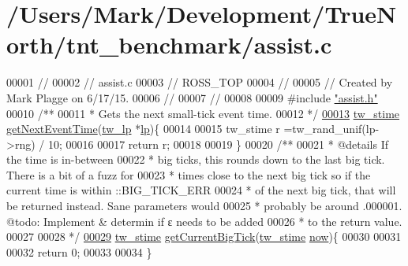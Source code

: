 \hypertarget{assist_8c_source}{}\section{/\+Users/\+Mark/\+Development/\+True\+North/tnt\+\_\+benchmark/assist.c}

\begin{DoxyCode}
00001 \textcolor{comment}{//}
00002 \textcolor{comment}{//  assist.c}
00003 \textcolor{comment}{//  ROSS\_TOP}
00004 \textcolor{comment}{//}
00005 \textcolor{comment}{//  Created by Mark Plagge on 6/17/15.}
00006 \textcolor{comment}{//}
00007 \textcolor{comment}{//}
00008 
00009 \textcolor{preprocessor}{#}\textcolor{preprocessor}{include} \hyperlink{assist_8h}{"assist.h"}
00010 \textcolor{comment}{/**}
00011 \textcolor{comment}{ *  Gets the next small-tick event time.}
00012 \textcolor{comment}{ */}
\hypertarget{assist_8c_source_l00013}{}\hyperlink{assist_8h_a30602b11dbfa6bcb90dc00e7942cfb02}{00013} \hyperlink{assist_8h_a30602b11dbfa6bcb90dc00e7942cfb02}{tw\_stime} \hyperlink{assist_8h_a30602b11dbfa6bcb90dc00e7942cfb02}{getNextEventTime}(\hyperlink{assist_8h_a30602b11dbfa6bcb90dc00e7942cfb02}{tw\_lp} *\hyperlink{assist_8h_a30602b11dbfa6bcb90dc00e7942cfb02}{lp})\{
00014 
00015     tw\_stime r =tw\_rand\_unif(lp->rng) / 10;
00016 
00017     \textcolor{keywordflow}{return} r;
00018 
00019 \}
00020 \textcolor{comment}{/**}
00021 \textcolor{comment}{ *  @details  If the time is in-between}
00022 \textcolor{comment}{ *  big ticks, this rounds down to the last big tick. There is a bit of a fuzz for}
00023 \textcolor{comment}{ *  times close to the next big tick so if the current time is within  ::BIG\_TICK\_ERR}
00024 \textcolor{comment}{ *  of the next big tick, that will be returned instead. Sane parameters would}
00025 \textcolor{comment}{ *  probably be around .000001. @todo: Implement & determin if ε needs to be added}
00026 \textcolor{comment}{ *  to the return value.}
00027 \textcolor{comment}{}
00028 \textcolor{comment}{ */}
\hypertarget{assist_8c_source_l00029}{}\hyperlink{assist_8h_a4d378196b7fceed090d64ec8820b4065}{00029} \hyperlink{assist_8h_a4d378196b7fceed090d64ec8820b4065}{tw\_stime} \hyperlink{assist_8h_a4d378196b7fceed090d64ec8820b4065}{getCurrentBigTick}(\hyperlink{assist_8h_a4d378196b7fceed090d64ec8820b4065}{tw\_stime} 
      \hyperlink{assist_8h_a4d378196b7fceed090d64ec8820b4065}{now})\{
00030 
00031 
00032     \textcolor{keywordflow}{return} 0;
00033 
00034 \}
\end{DoxyCode}
